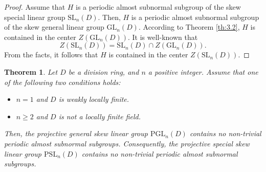 \documentclass{amsart}
\newtheorem{theorem}{Theorem}[section]
\theoremstyle{definition}
\begin{document}
\begin{proof} Assume that $H$ is a periodic almost subnormal subgroup of the skew special linear group $\mathrm{SL}_n(D).$ Then, $H$ is a periodic almost subnormal subgroup of the skew general linear group $\mathrm{GL}_n(D).$ According to Theorem \ref{th:3.2}, $H$ is contained in the center $Z(\mathrm{GL}_n(D)).$ It is well-known that $$Z(\mathrm{SL}_n(D))=\mathrm{SL}_n(D)\cap Z(\mathrm{GL}_n(D)).$$ From the facts, it follows that $H$ is contained in the center $Z(\mathrm{SL}_n(D)).$
\end{proof}
\begin{theorem}\label{th:3.4} Let $D$ be a division ring, and $n$ a positive integer. Assume that one of the following two conditions holds:
	\begin{itemize}
		\item [(1)] $n=1$ and $D$ is weakly locally finite.
		\item [(2)] $n\geq 2$ and $D$ is not a locally finite field.
	\end{itemize}
	Then, the projective general skew linear group $\mathrm{PGL}_n(D)$ contains no non-trivial periodic almost subnormal subgroups. Consequently, the projective special skew  linear group $\mathrm{PSL}_n(D)$ contains no non-trivial periodic almost subnormal subgroups.
\end{theorem}
\end{document}
